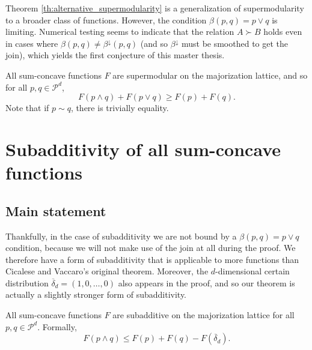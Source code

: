 \noindent Theorem \ref{th:alternative_supermodularity} is a generalization of supermodularity to a broader class of functions. However, the condition $\beta(p, q) = p \vee q$ is limiting. Numerical testing seems to indicate that the relation $A \succ B$ holds even in cases where $\beta(p, q) \neq \beta^\downarrow(p, q)$ (and so $\beta^\downarrow$ must be smoothed to get the join), which yields the first conjecture of this master thesis.

\begin{conjecture} \label{conj:alternative_supermodularity}
    All sum-concave functions $F$ are supermodular on the majorization lattice, and so for all $p, q \in \mathcal{P}^d$,
    \begin{equation}
        F(p \wedge q) + F(p \vee q) \geq F(p) + F(q).
    \end{equation}
    Note that if $p \sim q$, there is trivially equality.
\end{conjecture}



\section{Subadditivity of all sum-concave functions} \label{sec:alternative_subadditivity}

\subsection{Main statement}

Thankfully, in the case of subadditivity we are not bound by a $\beta(p, q) = p \vee q$ condition, because we will not make use of the join at all during the proof. We therefore have a form of subadditivity that is applicable to more functions than Cicalese and Vaccaro's original theorem. Moreover, the $d$-dimensional certain distribution $\overline{\delta}_d = (1, 0, \dots, 0)$ also appears in the proof, and so our theorem is actually a slightly stronger form of subadditivity.

\begin{theorem} \label{th:alternative_subadditivity}
    All sum-concave functions $F$ are subadditive on the majorization lattice for all $p, q \in \mathcal{P}^d$. Formally,
    \begin{equation} \label{eq:subadditivity}
        F(p \wedge q) \leq F(p) + F(q) - F(\overline{\delta}_d).
    \end{equation}
\end{theorem}


